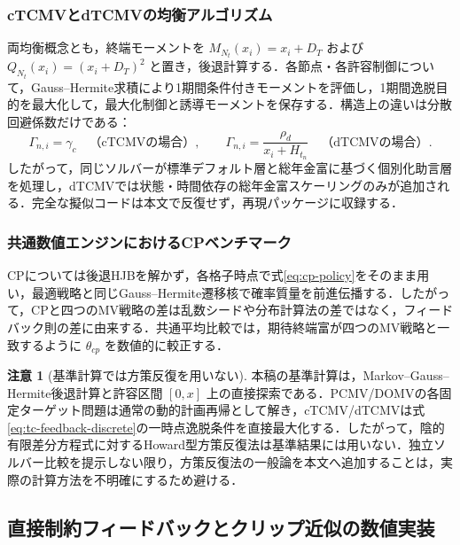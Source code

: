 \documentclass[10pt,a4paper]{article}
\theoremstyle{plain}
\theoremstyle{definition}
\newtheorem{remark}{注意}
\begin{document}
\subsubsection{cTCMVとdTCMVの均衡アルゴリズム}
両均衡概念とも，終端モーメントを $M_{N_t}(x_i)=x_i+D_T$ および $Q_{N_t}(x_i)=(x_i+D_T)^2$ と置き，後退計算する．各節点・各許容制御について，Gauss--Hermite求積により1期間条件付きモーメントを評価し，1期間逸脱目的を最大化して，最大化制御と誘導モーメントを保存する．構造上の違いは分散回避係数だけである：
\begin{equation}
\Gamma_{n,i}=\gamma_c\quad\text{（cTCMVの場合）},
\qquad
\Gamma_{n,i}=\frac{\rho_d}{x_i+H_{t_n}}\quad\text{（dTCMVの場合）}.
\label{eq:gamma-grid-compact}
\end{equation}
したがって，同じソルバーが標準デフォルト層と総年金富に基づく個別化助言層を処理し，dTCMVでは状態・時間依存の総年金富スケーリングのみが追加される．完全な擬似コードは本文で反復せず，再現パッケージに収録する．




\subsubsection{共通数値エンジンにおけるCPベンチマーク}

CPについては後退HJBを解かず，各格子時点で式\eqref{eq:cp-policy}をそのまま用い，最適戦略と同じGauss--Hermite遷移核で確率質量を前進伝播する．したがって，CPと四つのMV戦略の差は乱数シードや分布計算法の差ではなく，フィードバック則の差に由来する．共通平均比較では，期待終端富が四つのMV戦略と一致するように $\theta_{cp}$ を数値的に較正する．

\begin{remark}[基準計算では方策反復を用いない]
本稿の基準計算は，Markov--Gauss--Hermite後退計算と許容区間 $[0,x]$ 上の直接探索である．PCMV/DOMVの各固定ターゲット問題は通常の動的計画再帰として解き，cTCMV/dTCMVは式\eqref{eq:tc-feedback-discrete}の一時点逸脱条件を直接最大化する．したがって，陰的有限差分方程式に対するHoward型方策反復法は基準結果には用いない．独立ソルバー比較を提示しない限り，方策反復法の一般論を本文へ追加することは，実際の計算方法を不明確にするため避ける．
\end{remark}

\subsection{直接制約フィードバックとクリップ近似の数値実装}
\label{sec:projection-gap}
\end{document}
